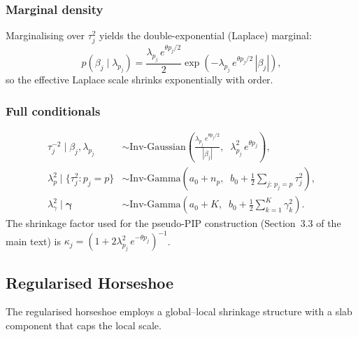 \documentclass[12pt]{article}
\begin{document}
\subsubsection{Marginal density}
Marginalising over $\tau^2_j$ yields the double-exponential (Laplace) marginal:
\begin{equation}
p(\beta_j \mid \lambda_{p_j}) = \frac{\lambda_{p_j}\, e^{\theta p_j/2}}{2} \exp\!\left(-\lambda_{p_j}\, e^{\theta p_j/2}\, |\beta_j|\right),
\end{equation}
so the effective Laplace scale shrinks exponentially with order.

\subsubsection{Full conditionals}
\begin{align}
\tau^{-2}_j \mid \beta_j, \lambda_{p_j} &\sim \mathrm{Inv\text{-}Gaussian}\!\left(\frac{\lambda_{p_j}\, e^{\theta p_j/2}}{|\beta_j|},\;\; \lambda^2_{p_j}\, e^{\theta p_j}\right),\\
\lambda^2_p \mid \{\tau^2_j : p_j = p\} &\sim \mathrm{Inv\text{-}Gamma}\!\left(a_0 + n_p,\;\; b_0 + \frac{1}{2}\sum_{j:\,p_j=p} \tau^2_j\right),\\
\lambda^2_\gamma \mid \boldsymbol{\gamma} &\sim \mathrm{Inv\text{-}Gamma}\!\left(a_0 + K,\;\; b_0 + \frac{1}{2}\sum_{k=1}^K \gamma_k^2\right).
\end{align}
The shrinkage factor used for the pseudo-PIP construction (Section~3.3 of the
main text) is $\kappa_j = (1 + 2\lambda^2_{p_j}\, e^{-\theta p_j})^{-1}$.

\subsection{Regularised Horseshoe}

The regularised horseshoe \citep{PiironenVehtari2017} employs a global--local
shrinkage structure with a slab component that caps the local scale.
\end{document}
